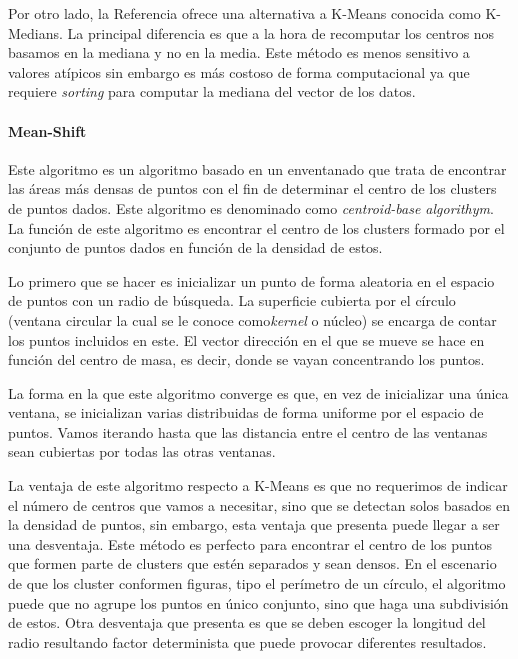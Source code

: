 \documentclass[conference,a4paper]{IEEEtran}
\begin{document}
Por otro lado, la Referencia ofrece una alternativa a K-Means conocida como K-Medians. La principal diferencia es que a la hora de recomputar los centros nos basamos en la mediana y no en la media. Este método es menos sensitivo a valores atípicos sin embargo es más costoso de forma computacional ya que requiere \textit{sorting} para computar la mediana del vector de los datos.\\

\paragraph{\textbf{Mean-Shift}}

Este algoritmo es un algoritmo basado en un enventanado que trata de encontrar las áreas más densas de puntos con el fin de determinar el centro de los clusters de puntos dados. Este algoritmo es denominado como \textit{centroid-base algorithym}. La función de este algoritmo es encontrar el centro de los clusters formado por el conjunto de puntos dados en función de la densidad de estos.

Lo primero que se hacer es inicializar un punto de forma aleatoria en el espacio de puntos con un radio de búsqueda. La superficie cubierta por el círculo (ventana circular la cual se le conoce como\textit{kernel} o núcleo) se encarga de contar los puntos incluidos en este. El vector dirección en el que se mueve se hace en función del centro de masa, es decir, donde se vayan concentrando los puntos.

La forma en la que este algoritmo converge es que, en vez de inicializar una única ventana, se inicializan varias distribuidas de forma uniforme por el espacio de puntos. Vamos iterando hasta que las distancia entre el centro de las ventanas sean cubiertas por todas las otras ventanas.

La ventaja de este algoritmo respecto a K-Means es que no requerimos de indicar el número de centros que vamos a necesitar, sino que se detectan solos basados en la densidad de puntos, sin embargo, esta ventaja que presenta puede llegar a ser una desventaja. Este método es perfecto para encontrar el centro de los puntos que formen parte de clusters que estén separados y sean densos. En el escenario de que los cluster conformen figuras, tipo el perímetro de un círculo, el algoritmo puede que no agrupe los puntos en único conjunto, sino que haga una subdivisión de estos. Otra desventaja que presenta es que se deben escoger la longitud del radio resultando factor determinista que puede provocar diferentes resultados.\\
\end{document}
